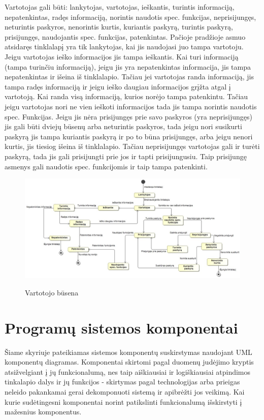 ﻿\documentclass{VUMIFPSkursinis}
\begin{document}
Vartotojas gali būti: lankytojas, vartotojas, ieškantis, turintis informaciją, nepatenkintas, radęs informaciją, norintis naudotis spec. funkcijas, neprisijungęs, neturintis paskyros, nenorintis kurtis, kuriantis paskyrą, turintis paskyrą, prisijungęs, naudojantis spec. funkcijas, patenkintas. Pačioje pradžioje asmuo atsidaręs tinklalapį yra tik lankytojas, kai jis naudojasi juo tampa vartotoju. Jeigu vartotojas ieško informacijos jis tampa ieškantis. Kai turi informaciją (tampa turinčiu informaciją), jeigu jis yra nepatenkintas informacija, jis tampa nepatenkintas ir išeina iš tinklalapio. Tačiau jei vartotojas randa informaciją, jis tampa radęs informaciją ir jeigu ieško daugiau informacijos grįžta atgal į vartotoją. Kai randa visą informaciją, kurios norėjo tampa patenkintu. Tačiau jeigu vartotojas nori ne vien ieškoti informacijos tada jis tampa norintis naudotis spec. Funkcijas. Jeigu jis nėra prisijungęs prie savo paskyros (yra neprisijungęs) jis gali būti dviejų būsenų arba neturintis paskyros, tada jeigu nori susikurti paskyrą jis tampa kuriantis paskyrą ir po to būna prisijungęs, arba jeigu nenori kurtis, jis tiesiog išeina iš tinklalapio. Tačiau neprisijungęs vartotojas gali ir turėti paskyrą, tada jis gali prisijungti prie jos ir tapti prisijungusiu. Taip prisijungę asmenys gali naudotis spec. funkcijomis ir taip tampa patenkinti.

\begin{figure} [H]
	\centering
    \includegraphics[scale=0.45]{img/Pav/VartotojoBusena}
	\label{uml:30}
	\caption{Vartotojo būsena}
\end{figure}

\section{Programų sistemos komponentai}
 
Šiame skyriuje pateikiamas sistemos komponentų suskirstymas naudojant UML komponentų diagramas. Komponentai skirtomi pagal duomenų judėjimo kryptis atsižvelgiant į jų funkcionalumą, nes taip aiškiausiai ir logiškiausiai atpindimos tinkalapio dalys ir jų funkcijos - skirtymas pagal technologijas arba prieigas neleido pakankamai gerai dekomponuoti sistemą ir apibrėžti jos veikimą. Kai kurie sudėtingesni komponentai norint patikslinti funkcionalumą išskirstyti į mažesnius komponentus.
\end{document}
